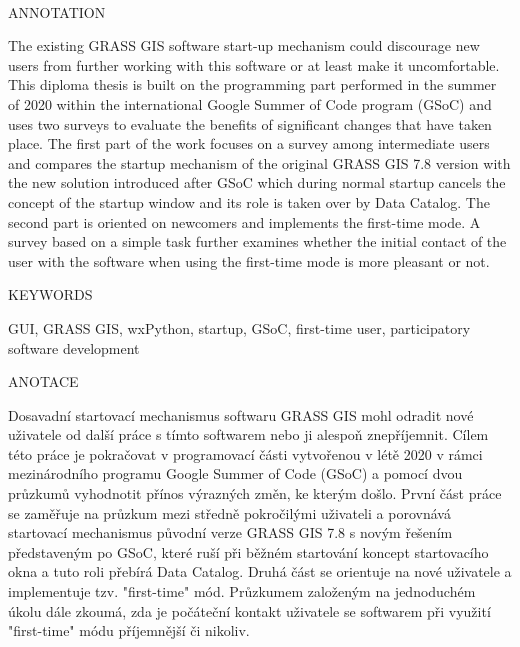 \documentclass[a4paper,10pt,twoside]{article}
\begin{document}

\newpage ~ \newpage
\thispagestyle{empty}


\renewcommand{\baselinestretch}{1.25} %


\begin{Large}
\noindent ANNOTATION
\end{Large}

\large
\noindent
The existing GRASS GIS software start-up mechanism could discourage new users from further working with this software or at least make it uncomfortable. This diploma thesis is built on the programming part performed in the summer of 2020 within the international Google Summer of Code program (GSoC) and uses two surveys to evaluate the benefits of significant changes that have taken place. The first part of the work focuses on a survey among intermediate users and compares the startup mechanism of the original GRASS GIS 7.8 version with the new solution introduced after GSoC which during normal startup cancels the concept of the startup window and its role is taken over by Data Catalog. The second part is oriented on newcomers and implements the first-time mode. A survey based on a simple task further examines whether the initial contact of the user with the software when using the first-time mode is more pleasant or not.

\vspace{2ex}
\begin{Large}
\noindent KEYWORDS
\end{Large}

\large
\noindent
\textrm{GUI, GRASS GIS, wxPython, startup, GSoC, first-time user, participatory software development}

\mbox{}
\vfill

\begin{Large}
\noindent ANOTACE
\end{Large} 

\large
\noindent
Dosavadní startovací mechanismus softwaru GRASS GIS mohl odradit nové uživatele od další práce s tímto softwarem nebo ji alespoň znepříjemnit. Cílem této práce je pokračovat v programovací části vytvořenou v létě 2020 v rámci mezinárodního programu Google Summer of Code (GSoC) a pomocí dvou průzkumů vyhodnotit přínos výrazných změn, ke kterým došlo. První část práce se zaměřuje na průzkum mezi středně pokročilými uživateli a porovnává startovací mechanismus původní verze GRASS GIS 7.8 s novým řešením představeným po GSoC, které ruší při běžném startování koncept startovacího okna a tuto roli přebírá Data Catalog. Druhá část se orientuje na nové uživatele a implementuje tzv. "first-time" mód. Průzkumem založeným na jednoduchém úkolu dále zkoumá, zda je počáteční kontakt uživatele se softwarem při využití "first-time" módu příjemnější či nikoliv.
\end{document}
